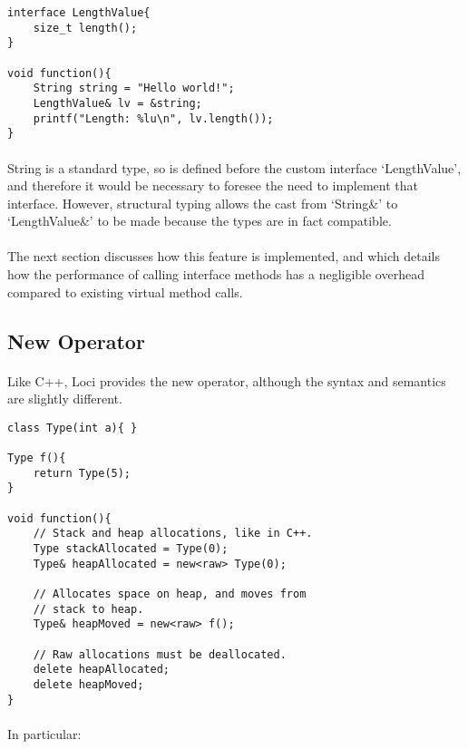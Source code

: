 \documentclass[12pt,twoside,notitlepage]{report}
\begin{document}
\small{
\begin{verbatim}
interface LengthValue{
    size_t length();
}

void function(){
    String string = "Hello world!";
    LengthValue& lv = &string;
    printf("Length: %lu\n", lv.length());
}
\end{verbatim}
}

\paragraph{}
String is a standard type, so is defined before the custom interface `LengthValue', and therefore it would be necessary to foresee the need to implement that interface. However, structural typing allows the cast from `String\&' to `LengthValue\&' to be made because the types are in fact compatible.

\paragraph{}
The next section discusses how this feature is implemented, and which details how the performance of calling interface methods has a negligible overhead compared to existing virtual method calls.

\subsection{New Operator}

\paragraph{}
Like C++, Loci provides the new operator, although the syntax and semantics are slightly different.

\small{
\begin{verbatim}
class Type(int a){ }

Type f(){
    return Type(5);
}

void function(){
    // Stack and heap allocations, like in C++.
    Type stackAllocated = Type(0);
    Type& heapAllocated = new<raw> Type(0);
    
    // Allocates space on heap, and moves from
    // stack to heap.
    Type& heapMoved = new<raw> f();
    
    // Raw allocations must be deallocated.
    delete heapAllocated;
    delete heapMoved;
}
\end{verbatim}
}

\paragraph{}
In particular:
\end{document}
